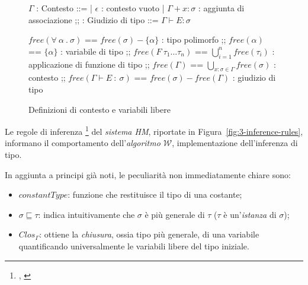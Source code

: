 \begin{figure}
    \vspace{4mm}
    \begin{bnf}
        $\Gamma$ : \small{Contesto} ::=
        | $\epsilon$ : \small{contesto vuoto}
        | $\Gamma + x \colon \sigma$ : \small{aggiunta di associazione}
        ;;
        : \small{Giudizio di tipo} ::= $\Gamma \vdash E \colon \sigma$
    \end{bnf}
    \par\vspace{12mm}
    \begin{bnf}
        $free(\forall\ \alpha\ .\ \sigma)$ == $free(\sigma) - \{\alpha\}$ : \small{tipo polimorfo}
        ;;
        $free(\alpha)$ == $\{\alpha\}$ : \small{variabile di tipo}
        ;;
        $free(F\ \tau_1\ldots\tau_n)$ == $\bigcup\limits_{i=1}^{n} free(\tau_i)$ : \small{applicazione di funzione di tipo}
        ;;
        $free(\Gamma)$ == $\bigcup\limits_{x\colon\sigma\in\Gamma} free(\sigma)$ : \small{contesto}
        ;;
        $free(\Gamma\vdash E\ \colon\ \sigma)$ == $free(\sigma) - free(\Gamma)$ : \small{giudizio di tipo}
    \end{bnf}
    \caption{Definizioni di contesto e variabili libere}
    \label{fig:3-context-free-variables}
    \vspace{4mm}
\end{figure}

\noindent Le regole di inferenza%
\footnote{, \cite{Clement-1986-MiniML}}
del \textit{sistema HM}, riportate in Figura~\ref{fig:3-inference-rules},
informano il comportamento dell'\textit{algoritmo $\mathcal{W}$}, implementazione dell'inferenza di tipo.

\newpage

\noindent In aggiunta a principi già noti, le peculiarità non immediatamente chiare sono:
\begin{itemize}
    \item $constantType$: funzione che restituisce il tipo di una costante;
    \item $\sigma \sqsubseteq \tau$: indica intuitivamente che $\sigma$ è più generale di $\tau$
          ($\tau$ è un'\textit{istanza} di $\sigma$);
    \item $Clos_\Gamma$: ottiene la \textit{chiusura}, ossia tipo più generale, di una variabile
          quantificando universalmente le variabili libere del tipo iniziale.
\end{itemize}

